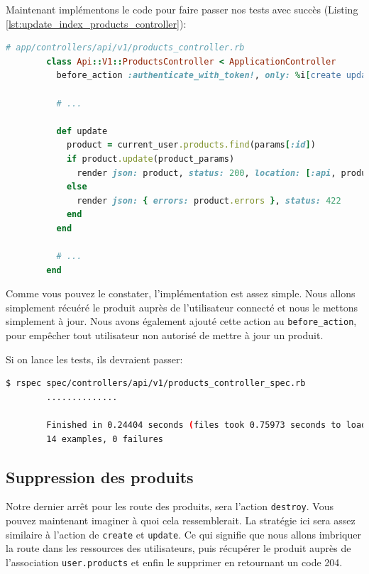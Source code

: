 \documentclass[]{report}
\begin{document}
      Maintenant implémentons le code pour faire passer nos tests avec succès (Listing \ref{lst:update_index_products_controller}):

      \begin{scriptsize}
        \begin{lstlisting}[language=ruby, caption={Implémentation de la mise à jour des produits}, label={lst:update_index_products_controller}]
        # app/controllers/api/v1/products_controller.rb
        class Api::V1::ProductsController < ApplicationController
          before_action :authenticate_with_token!, only: %i[create update]

          # ...

          def update
            product = current_user.products.find(params[:id])
            if product.update(product_params)
              render json: product, status: 200, location: [:api, product]
            else
              render json: { errors: product.errors }, status: 422
            end
          end

          # ...
        end
        \end{lstlisting}
      \end{scriptsize}

      Comme vous pouvez le constater, l'implémentation est assez simple. Nous allons simplement récuéré le produit auprès de l'utilisateur connecté et nous le mettons simplement à jour. Nous avons également ajouté cette action au \verb|before_action|, pour empêcher tout utilisateur non autorisé de mettre à jour un produit.

      Si on lance les tests, ils devraient passer:

      \begin{scriptsize}
        \begin{lstlisting}[language=bash]
        $ rspec spec/controllers/api/v1/products_controller_spec.rb
        ..............

        Finished in 0.24404 seconds (files took 0.75973 seconds to load)
        14 examples, 0 failures
        \end{lstlisting}
      \end{scriptsize}

    \subsection{Suppression des produits}

      Notre dernier arrêt pour les route des produits, sera l'action \verb|destroy|. Vous pouvez maintenant imaginer à quoi cela ressemblerait. La stratégie ici sera assez similaire à l'action de \verb|create| et \verb|update|. Ce qui signifie que nous allons imbriquer la route dans les ressources des utilisateurs, puis récupérer le produit auprès de l'association \verb|user.products| et enfin le supprimer en retournant un code 204.
\end{document}

